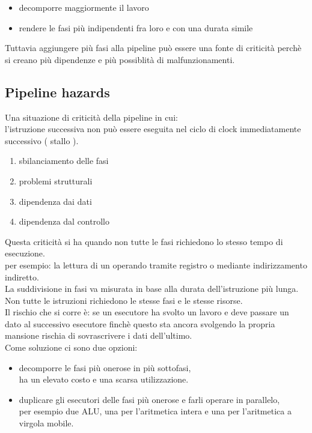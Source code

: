 \documentclass[arch.tex]{subfiles}
\begin{document}
\begin{itemize}
	\item decomporre maggiormente il lavoro
	\item rendere le fasi più indipendenti fra loro e con
		una durata simile
\end{itemize}
Tuttavia aggiungere più fasi alla pipeline può essere una fonte di criticità 
perchè si creano più dipendenze e più possiblità di malfunzionamenti.

\subsection{Pipeline hazards}%
\label{sub:pipeline_hazards}

Una situazione di criticità della pipeline in cui:\\
l'istruzione successiva non può essere eseguita nel ciclo di clock 
immediatamente successivo ( stallo ).

\begin{enumerate}
	\item sbilanciamento delle fasi
	\item problemi strutturali
	\item dipendenza dai dati
	\item dipendenza dal controllo
\end{enumerate}

%
\label{par:sbilanciamento_delle_fasi}
Questa criticità si ha quando non tutte le fasi richiedono lo stesso tempo
di esecuzione.\\
per esempio: la lettura di un operando tramite registro o mediante indirizzamento
indiretto.\\
La suddivisione in fasi va misurata in base alla durata 
dell'istruzione più lunga.\\
Non tutte le istruzioni richiedono le stesse  fasi e le stesse risorse.\\
Il rischio che si corre è: se un esecutore ha svolto
un lavoro e deve passare un dato al successivo esecutore finchè questo
sta ancora svolgendo la propria mansione rischia di sovrascrivere i dati 
dell'ultimo.\\
Come soluzione ci sono due opzioni:

\begin{itemize}
	\item decomporre le fasi più onerose in più sottofasi,\\
		ha un elevato costo e una scarsa utilizzazione.
	\item duplicare gli esecutori delle fasi più onerose e farli operare in 
		parallelo,\\
		per esempio due ALU, una per l'aritmetica intera e una per
		l'aritmetica a virgola mobile.
\end{itemize}
\end{document}
